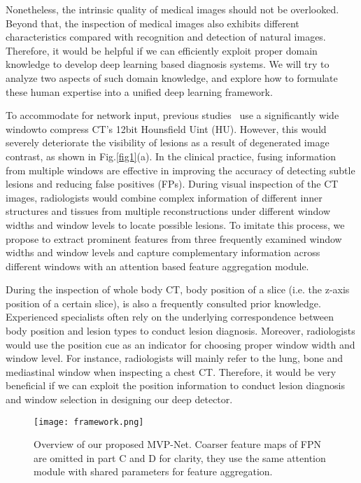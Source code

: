 \documentclass[runningheads]{llncs}
\begin{document}
Nonetheless, the intrinsic quality of medical images should not be overlooked. Beyond that, the inspection of medical images also exhibits different characteristics compared with recognition and detection of natural images. Therefore, it would be helpful if we can efficiently exploit proper domain knowledge to develop deep learning based diagnosis systems. We will try to analyze two aspects of such domain knowledge, and explore how to formulate these human expertise into a unified deep learning framework. 


To accommodate for network input, previous studies~\cite{ULDOR, 3DCE} use a significantly wide window\footnotemark[2] to compress CT's 12bit Hounsfield Uint (HU). However, this would severely deteriorate the visibility of lesions as a result of degenerated image contrast, as shown in Fig.\ref{fig1}(a). In the clinical practice, fusing information from multiple windows are effective in improving the accuracy of detecting subtle lesions and reducing false positives (FPs). During visual inspection of the CT images, radiologists would combine complex information of different inner structures and tissues from multiple reconstructions under different window widths and window levels to locate possible lesions. To imitate this process, we propose to extract prominent features from three frequently examined window widths and window levels and capture complementary information across different windows with an attention based feature aggregation module. 



During the inspection of whole body CT, body position of a slice (i.e. the z-axis position of a certain slice), is also a frequently consulted prior knowledge. Experienced specialists often rely on the underlying correspondence between body position and lesion types to conduct lesion diagnosis. Moreover, radiologists would use the position cue as an indicator for choosing proper window width and window level. For instance, radiologists will mainly refer to the lung, bone and mediastinal window when inspecting a chest CT. Therefore, it would be very beneficial if we can exploit the position information to conduct lesion diagnosis and window selection in designing our deep detector.

\begin{figure}[!tbp]
\texttt{[image: framework.png]}
\caption{Overview of our proposed MVP-Net. Coarser feature maps of FPN are omitted in part C and D for clarity, they use the same attention module with shared parameters for feature aggregation.} \label{fig2}
\end{figure}
\end{document}
